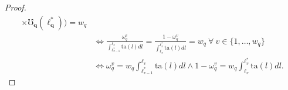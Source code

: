\documentclass[hidelinks, nonatbib]{elsarticle}
\begin{document}
\begin{lemma}
\begin{proof}
\begin{align}
                \times
                \boldsymbol{\mho_q}(
                    \boldsymbol{\ell_{q}^{*}}
                )
            )
            =
            w_q
            \\
            &\iff
            \frac{
                \omega_{q}^{v}
            }{
                \int_{
                    \ell_{v-1}^{*}
                }^{
                    \ell_{v}
                }{
                    \text{ta}(l)dl
                }
            }
            =
            \frac{
                1 - \omega_{q}^{v}
            }{
                \int_{
                    \ell_{v}
                }^{
                    \ell_{v}^{*}
                }{
                    \text{ta}(l)dl
                }
            }
            =
            w_q
            \
            \forall
            \
            v \in \{1, \dots, w_q\}
            \\
            &\iff
            \omega_{q}^{v}
            =
            w_q
            \int_{
                \ell_{v-1}^{*}
            }^{
                \ell_{v}
            }{
                \text{ta}(l)
                dl
            }
            \land
            1 - \omega_{q}^{v}
            =
            w_q
            \int_{
                \ell_{v}
            }^{
                \ell_{v}^{*}
            }{
                \text{ta}(l)
                dl
            }
            .
        \end{align}

\end{proof}
\end{lemma}
\end{document}
